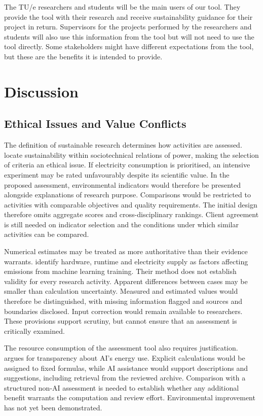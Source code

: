 The TU/e researchers and students will be the main users of our tool. They provide the tool with their research and receive sustainability guidance for their project in return.  Supervisors for the projects performed by the researchers and students will also use this information from the tool but will not need to use the tool directly.  Some stakeholders might have different expectations from the tool, but these are the benefits it is intended to provide.

\FloatBarrier
\clearpage
\section{Discussion}

\subsection{Ethical Issues and Value Conflicts}

The definition of sustainable research determines how activities are assessed. \citet{hasselbalch2025sustainability} locate sustainability within sociotechnical relations of power, making the selection of criteria an ethical issue. If electricity consumption is prioritised, an intensive experiment may be rated unfavourably despite its scientific value. In the proposed assessment, environmental indicators would therefore be presented alongside explanations of research purpose. Comparisons would be restricted to activities with comparable objectives and quality requirements. The initial design therefore omits aggregate scores and cross-disciplinary rankings. Client agreement is still needed on indicator selection and the conditions under which similar activities can be compared.

Numerical estimates may be treated as more authoritative than their evidence warrants. \citet{lacoste2019carbon} identify hardware, runtime and electricity supply as factors affecting emissions from machine learning training. Their method does not establish validity for every research activity. Apparent differences between cases may be smaller than calculation uncertainty. Measured and estimated values would therefore be distinguished, with missing information flagged and sources and boundaries disclosed. Input correction would remain available to researchers. These provisions support scrutiny, but cannot ensure that an assessment is critically examined.

The resource consumption of the assessment tool also requires justification. \citet{lin2023cost} argues for transparency about AI's energy use. Explicit calculations would be assigned to fixed formulas, while AI assistance would support descriptions and suggestions, including retrieval from the reviewed archive. Comparison with a structured non-AI assessment is needed to establish whether any additional benefit warrants the computation and review effort. Environmental improvement has not yet been demonstrated.

